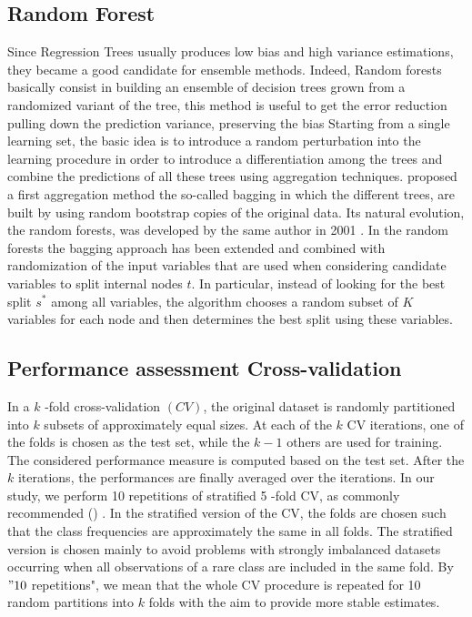 \documentclass[a4,12pt]{article}
\begin{document}
\subsection{Random Forest}
Since Regression Trees usually produces low bias and high variance estimations, they became a good candidate for ensemble methods. 
Indeed, Random forests basically consist in building an ensemble of decision trees grown from a randomized variant of the tree, this method is useful to get the error reduction pulling down the prediction variance, preserving the bias
Starting from a single learning set,  the basic idea is to introduce a random perturbation into the learning procedure in order to introduce a differentiation among the trees and combine the predictions of all these trees using aggregation techniques. 
\cite{Breiman96} proposed a first aggregation method the so-called bagging in which the different trees, are built by using random bootstrap copies of the original data. 
Its natural evolution, the random forests, was developed by the same author in 2001 \cite{Breiman01}. 
In the random forests the bagging approach has been extended and combined with randomization of the input variables that are used when considering candidate variables to split internal nodes $t$. 
In particular, instead of looking for the best split $s^*$ among all variables, the algorithm chooses a random subset of $K$ variables for each node and then determines the best split using these variables. \\

\subsection{Performance assessment Cross-validation}
In a $k$ -fold cross-validation $(C V)$, the original dataset is randomly partitioned into $k$ subsets of approximately equal sizes. At each of the $k$ CV iterations, one of the folds is chosen as the test set, while the $k-1$ others are used for training. The considered performance measure is computed based on the test set. After the $k$ iterations, the performances are finally averaged over the iterations. In our study, we perform 10 repetitions of stratified 5 -fold $\mathrm{CV}$, as commonly recommended (\cite{Bischl12}) . In the stratified version of the CV, the folds are chosen such that the class frequencies are approximately the same in all folds. The stratified version is chosen mainly to avoid problems with strongly imbalanced datasets occurring when all observations of a rare class are included in the same fold. By $" 10$ repetitions", we mean that the whole CV procedure is repeated for 10 random partitions into $k$ folds with the aim to provide more stable estimates.
\end{document}
